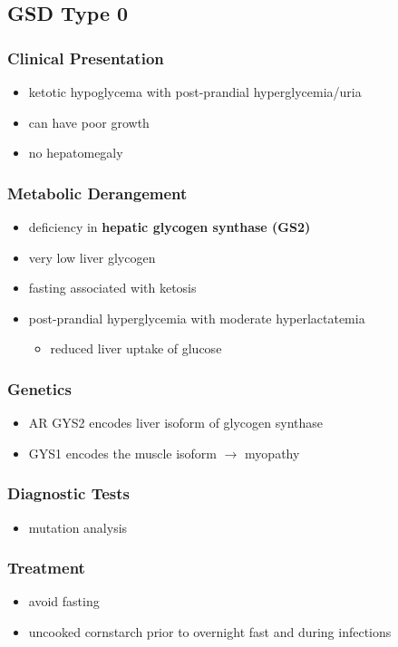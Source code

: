 \documentclass{scrartcl}
\begin{document}
\subsection{GSD Type 0}
\label{sec:org03e600c}
\subsubsection{Clinical Presentation}
\label{sec:orgdc700c8}
\begin{itemize}
\item ketotic hypoglycema with post-prandial hyperglycemia/uria
\item can have poor growth
\item no hepatomegaly
\end{itemize}
\subsubsection{Metabolic Derangement}
\label{sec:orga2de0cb}
\begin{itemize}
\item deficiency in \textbf{hepatic glycogen synthase (GS2)}
\item very low liver glycogen
\item fasting associated with ketosis
\item post-prandial hyperglycemia with moderate hyperlactatemia
\begin{itemize}
\item reduced liver uptake of glucose
\end{itemize}
\end{itemize}

\subsubsection{Genetics}
\label{sec:orgc002acd}
\begin{itemize}
\item AR GYS2 encodes liver isoform of glycogen synthase
\item GYS1 encodes the muscle isoform \(\to\) myopathy
\end{itemize}
\subsubsection{Diagnostic Tests}
\label{sec:org40e2796}
\begin{itemize}
\item mutation analysis
\end{itemize}
\subsubsection{Treatment}
\label{sec:orge68ae6d}
\begin{itemize}
\item avoid fasting
\item uncooked cornstarch prior to overnight fast and during infections
\end{itemize}
\end{document}
